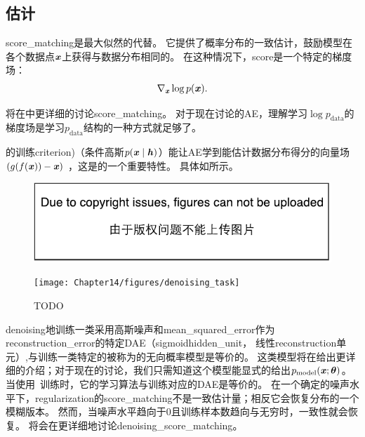 
\subsection{估计}
\label{sec:estimating_the_score}
\gls{score_matching}\citep{Hyvarinen-2005}是最大似然的代替。
它提供了概率分布的一致估计，鼓励模型在各个数据点$\boldsymbol{\mathit{x}}$上获得与数据分布相同的。
在这种情况下，\gls{score}是一个特定的梯度场：
\begin{align}
 \nabla_{\boldsymbol{\mathit{x}}} \log p(\boldsymbol{\mathit{x}}) .
\end{align}

将在中更详细的讨论\gls{score_matching}。
对于现在讨论的\gls{AE}，理解学习$\log p_{\text{data}}$的梯度场是学习$p_{\text{data}}$结构的一种方式就足够了。


的训练\gls{criterion})（条件高斯$p(\boldsymbol{\mathit{x}} \mid \boldsymbol{\mathit{h}})$）能让\gls{AE}学到能估计数据分布得分的向量场$(g(f(\boldsymbol{\mathit{x}}))-\boldsymbol{\mathit{x}})$ ，这是的一个重要特性。
具体如所示。

\begin{figure}[!htb]
\ifOpenSource
\centerline{\includegraphics{figure.pdf}}
\else
\centerline{\texttt{[image: Chapter14/figures/denoising\_task]}}
\fi
\caption{TODO}
\label{fig:chap14_denoising_task}
\end{figure}

\gls{denoising}地训练一类采用高斯噪声和\gls{mean_squared_error}作为\gls{reconstruction_error}的特定\gls{DAE}（sigmoid\gls{hidden_unit}， 线性\gls{reconstruction}单元）,与训练一类特定的被称为的无向概率模型是等价的\citep{Vincent-NC-2011-small}。
这类模型将在给出更详细的介绍；对于现在的讨论，我们只需知道这个模型能显式的给出$p_{\text{model}}(\boldsymbol{\mathit{x}}; \boldsymbol{\theta})$。
当使用~\citep{Kingma+LeCun-2010-small}训练时，它的学习算法与训练对应的\gls{DAE}是等价的。
在一个确定的噪声水平下，\gls{regularization}的\gls{score_matching}不是一致估计量；相反它会恢复分布的一个模糊版本。
然而，当噪声水平趋向于0且训练样本数趋向与无穷时，一致性就会恢复。
将会在更详细地讨论\gls{denoising_score_matching}。


